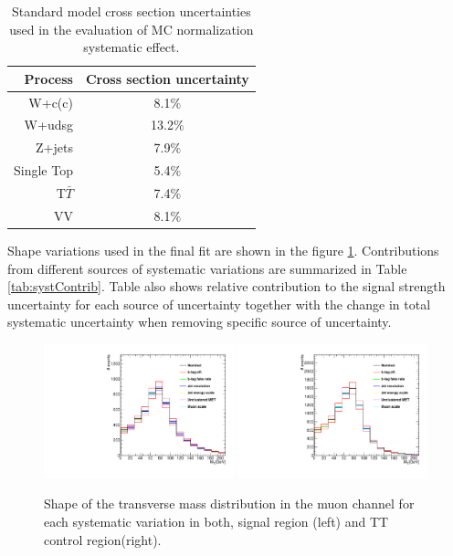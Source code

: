 \begin{table}[!htb]
\begin{center}
   \begin{tabular} {r c} \hline \hline
        Process         & Cross section uncertainty \\
        \hline
        W+c(c)          & 8.1$\%$ \\
        W+udsg          & 13.2$\%$ \\
        Z+jets          & 7.9$\%$ \\
        Single Top      & 5.4$\%$ \\
        T$\bar{T}$      & 7.4$\%$ \\
        VV              & 8.1$\%$ \\
        \hline\hline
   \end{tabular}
\caption{Standard model cross section uncertainties used in the evaluation of MC normalization systematic effect.}
\label{tab:SMunc}
\end{center}
\end{table}

Shape variations used in the final fit are shown in the figure \ref{fig:shapeVar}. Contributions from different sources of systematic variations are summarized in Table \ref{tab:systContrib}. Table also shows relative contribution to the signal strength uncertainty for each source of uncertainty together with the change in total systematic uncertainty when removing specific source of uncertainty.

\begin{figure}[htbp]
	\centering
		\includegraphics[width=0.49\textwidth]{Figures/syst_Wbb_var.pdf}
		\includegraphics[width=0.49\textwidth]{Figures/syst_TT_var.pdf}
	\caption[Shape of the transverse mass distribution for each systematic variation in both, signal region and TT control region.]{Shape of the transverse mass distribution in the muon channel for each systematic variation in both, signal region (left) and TT control region(right).}
	\label{fig:shapeVar}
\end{figure}

